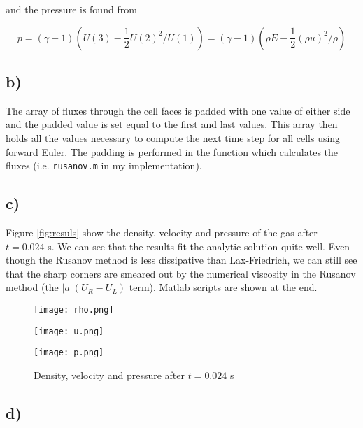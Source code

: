 \documentclass{article}
\newcommand{\oh}{\frac{1}{2}}
\begin{document}
and the pressure is found from 

\begin{equation}
p = (\gamma - 1) (U(3) - \oh U(2)^2/U(1) ) = (\gamma -1 ) (\rho E - \oh (\rho u)^2/\rho)
\end{equation}

\subsection{b)}
The array of fluxes through the cell faces is padded with one value of either side and the padded value is set equal to the first and last values. This array then holds all the values necessary to compute the next time step for all cells using forward Euler. The padding is performed in the function which calculates the fluxes (i.e. \texttt{rusanov.m} in my implementation).

\subsection{c)}
Figure \ref{fig:resuls} show the density, velocity and pressure of the gas after $ t = 0.024$ s. We can see that the results fit the analytic solution quite well. Even though the Rusanov method is less dissipative than Lax-Friedrich, we can still see that the sharp corners are smeared out by the numerical viscosity in the Rusanov method (the $|a|(U_R - U_L)$ term). Matlab scripts are shown at the end.

\begin{figure}
	\centering
	\begin{minipage}{0.45\textwidth}
		\texttt{[image: rho.png]}
	\end{minipage} \hfill
	\begin{minipage}{0.45\textwidth}
		\texttt{[image: u.png]}
	\end{minipage}	
	\begin{minipage}{0.45\textwidth}
		\texttt{[image: p.png]}
	\end{minipage}
	\caption{Density, velocity and pressure after $t=0.024$ s}
	\label{fig:results}
\end{figure}

\subsection{d)}
\end{document}
